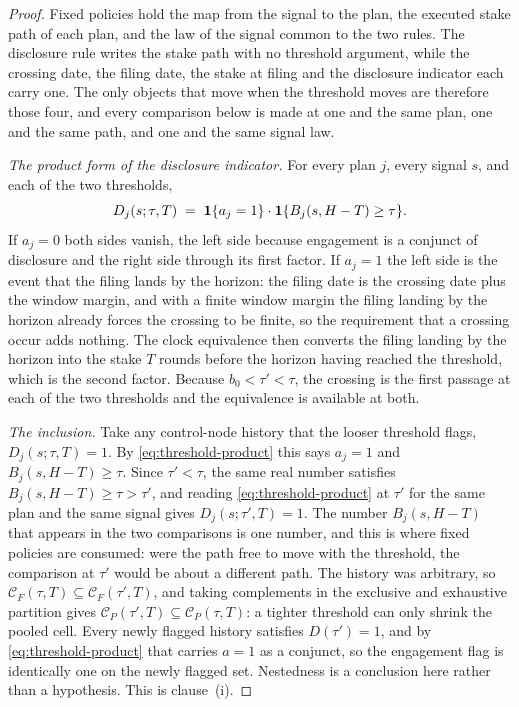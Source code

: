\begin{proof}
Fixed policies hold the map from the signal to the plan, the executed stake path of each plan, and
the law of the signal common to the two rules. The disclosure rule writes the stake path with no
threshold argument, while the crossing date, the filing date, the stake at filing and the
disclosure indicator each carry one. The only objects that move when the threshold moves are
therefore those four, and every comparison below is made at one and the same plan, one and the same
path, and one and the same signal law.

\emph{The product form of the disclosure indicator.} For every plan $j$, every signal $s$, and each
of the two thresholds,
\begin{equation}
\label{eq:threshold-product}
D_j(s;\tau,T) \;=\; \mathbf{1}\{a_j = 1\}\cdot\mathbf{1}\{B_j(s,H-T) \ge \tau\} .
\end{equation}
If $a_j = 0$ both sides vanish, the left side because engagement is a conjunct of disclosure and the
right side through its first factor. If $a_j = 1$ the left side is the event that the filing lands
by the horizon: the filing date is the crossing date plus the window margin, and with a finite
window margin the filing landing by the horizon already forces the crossing to be finite, so the
requirement that a crossing occur adds nothing. The clock equivalence then converts the filing
landing by the horizon into the stake $T$ rounds before the horizon having reached the threshold,
which is the second factor. Because $b_0 < \tau' < \tau$, the crossing is the first passage at each
of the two thresholds and the equivalence is available at both.

\emph{The inclusion.} Take any control-node history that the looser threshold flags,
$D_j(s;\tau,T) = 1$. By \eqref{eq:threshold-product} this says $a_j = 1$ and
$B_j(s,H-T) \ge \tau$. Since $\tau' < \tau$, the same real number satisfies
$B_j(s,H-T) \ge \tau > \tau'$, and reading \eqref{eq:threshold-product} at $\tau'$ for the same plan
and the same signal gives $D_j(s;\tau',T) = 1$. The number $B_j(s,H-T)$ that appears in the two
comparisons is one number, and this is where fixed policies are consumed: were the path free to move
with the threshold, the comparison at $\tau'$ would be about a different path. The history was
arbitrary, so $\mathcal C_F(\tau,T) \subseteq \mathcal C_F(\tau',T)$, and taking complements in the
exclusive and exhaustive partition gives
$\mathcal C_P(\tau',T) \subseteq \mathcal C_P(\tau,T)$: a tighter threshold can only shrink the
pooled cell. Every newly flagged history satisfies $D(\tau') = 1$, and by
\eqref{eq:threshold-product} that carries $a = 1$ as a conjunct, so the engagement flag is
identically one on the newly flagged set. Nestedness is a conclusion here rather than a hypothesis.
This is clause~(i).


\end{proof}
